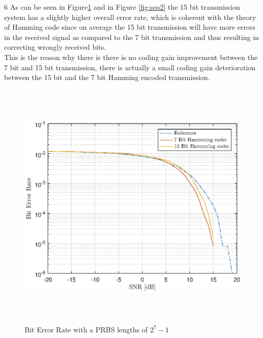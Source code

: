 \documentclass[12pt]{article}
\begin{document}
\clearpage

6 As can be seen in Figure\ref{fig:seq3} and in Figure \ref{fig:seq2} the 15 bit transmission system has a slightly higher overall error rate, which is coherent with the theory of Hamming code since on average the 15 bit transmission will have more errors in the received signal as compared to the 7 bit transmission and thus resulting in correcting wrongly received bits.\\
This is the reason why there is there is no coding gain improvement between the 7 bit and 15 bit transmission, there is actually a small coding gain deterioration between the 15 bit and the 7 bit Hamming encoded transmission.
\begin{figure}[H]
    \centering
    \includegraphics[height=12cm]{PlotSeq3.eps}
    \caption{Bit Error Rate with a PRBS lengths of $2^{7} -1$}
    \label{fig:seq3}
\end{figure}
\end{document}
